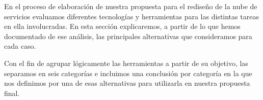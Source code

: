 En el proceso de elaboración de nuestra propuesta para el rediseño de la nube de servicios evaluamos diferentes tecnologías y herramientas para las distintas tareas en ella involucradas. En esta sección explicaremos, a partir de lo que hemos documentado de ese análisis, las principales alternativas que consideramos para cada caso.

Con el fin de agrupar lógicamente las herramientas a partir de su objetivo, las separamos en seis categorías e incluimos una conclusión por categoría en la que nos definimos por una de esas alternativas para utilizarla en nuestra propuesta final.
